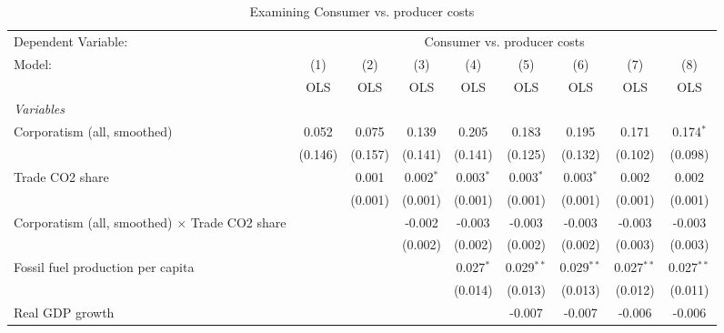
\begin{table}[htbp]
   \caption{Examining Consumer vs. producer costs}
   \centering
   \begin{tabular}{lcccccccc}
      \toprule
      Dependent Variable: & \multicolumn{8}{c}{Consumer vs. producer costs}\\
      Model:                                                & (1)     & (2)     & (3)         & (4)         & (5)          & (6)          & (7)          & (8)\\  
                                                            &  OLS    & OLS     & OLS         & OLS         & OLS          & OLS          & OLS          & OLS\\  
      \midrule
      \emph{Variables}\\
      Corporatism (all, smoothed)                           & 0.052   & 0.075   & 0.139       & 0.205       & 0.183        & 0.195        & 0.171        & 0.174$^{*}$\\   
                                                            & (0.146) & (0.157) & (0.141)     & (0.141)     & (0.125)      & (0.132)      & (0.102)      & (0.098)\\   
      Trade CO2 share                                       &         & 0.001   & 0.002$^{*}$ & 0.003$^{*}$ & 0.003$^{*}$  & 0.003$^{*}$  & 0.002        & 0.002\\   
                                                            &         & (0.001) & (0.001)     & (0.001)     & (0.001)      & (0.001)      & (0.001)      & (0.001)\\   
      Corporatism (all, smoothed) $\times$ Trade CO2 share  &         &         & -0.002      & -0.003      & -0.003       & -0.003       & -0.003       & -0.003\\   
                                                            &         &         & (0.002)     & (0.002)     & (0.002)      & (0.002)      & (0.003)      & (0.003)\\   
      Fossil fuel production per capita                     &         &         &             & 0.027$^{*}$ & 0.029$^{**}$ & 0.029$^{**}$ & 0.027$^{**}$ & 0.027$^{**}$\\   
                                                            &         &         &             & (0.014)     & (0.013)      & (0.013)      & (0.012)      & (0.011)\\   
      Real GDP growth                                       &         &         &             &             & -0.007       & -0.007       & -0.006       & -0.006\\   

\end{tabular}
\end{table}
